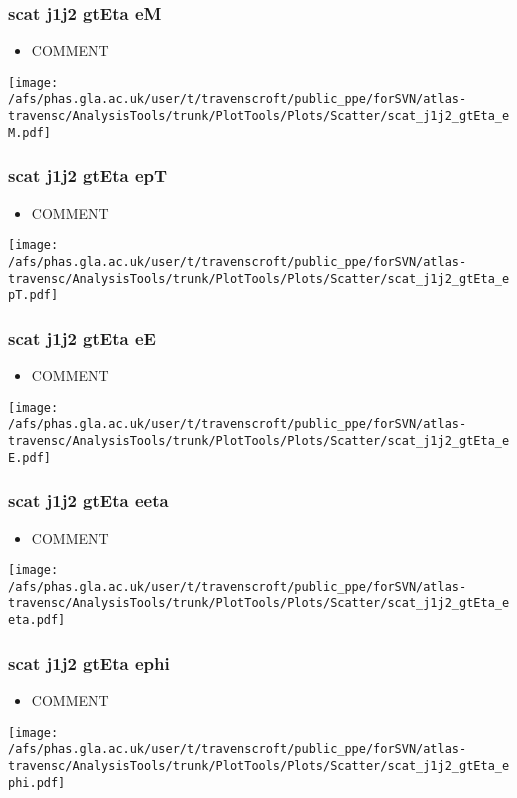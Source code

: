 \documentclass{beamer}
\begin{document}
\begin{frame}
\frametitle{scat j1j2 gtEta eM}
\begin{itemize}
\item COMMENT
\end{itemize}
\begin{center}
\texttt{[image: /afs/phas.gla.ac.uk/user/t/travenscroft/public\_ppe/forSVN/atlas-travensc/AnalysisTools/trunk/PlotTools/Plots/Scatter/scat\_j1j2\_gtEta\_eM.pdf]}
\end{center}
\end{frame}

\begin{frame}
\frametitle{scat j1j2 gtEta epT}
\begin{itemize}
\item COMMENT
\end{itemize}
\begin{center}
\texttt{[image: /afs/phas.gla.ac.uk/user/t/travenscroft/public\_ppe/forSVN/atlas-travensc/AnalysisTools/trunk/PlotTools/Plots/Scatter/scat\_j1j2\_gtEta\_epT.pdf]}
\end{center}
\end{frame}

\begin{frame}
\frametitle{scat j1j2 gtEta eE}
\begin{itemize}
\item COMMENT
\end{itemize}
\begin{center}
\texttt{[image: /afs/phas.gla.ac.uk/user/t/travenscroft/public\_ppe/forSVN/atlas-travensc/AnalysisTools/trunk/PlotTools/Plots/Scatter/scat\_j1j2\_gtEta\_eE.pdf]}
\end{center}
\end{frame}

\begin{frame}
\frametitle{scat j1j2 gtEta eeta}
\begin{itemize}
\item COMMENT
\end{itemize}
\begin{center}
\texttt{[image: /afs/phas.gla.ac.uk/user/t/travenscroft/public\_ppe/forSVN/atlas-travensc/AnalysisTools/trunk/PlotTools/Plots/Scatter/scat\_j1j2\_gtEta\_eeta.pdf]}
\end{center}
\end{frame}

\begin{frame}
\frametitle{scat j1j2 gtEta ephi}
\begin{itemize}
\item COMMENT
\end{itemize}
\begin{center}
\texttt{[image: /afs/phas.gla.ac.uk/user/t/travenscroft/public\_ppe/forSVN/atlas-travensc/AnalysisTools/trunk/PlotTools/Plots/Scatter/scat\_j1j2\_gtEta\_ephi.pdf]}
\end{center}
\end{frame}
\end{document}
